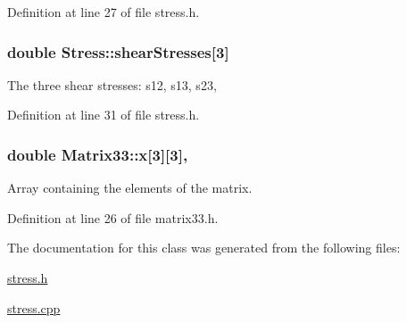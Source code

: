 Definition at line 27 of file stress.\-h.

\hypertarget{classStress_a77e8705e56c2fb56826a638edf3f78bf}{
\subsubsection[{shear\-Stresses}]{\setlength{\rightskip}{0pt plus 5cm}double Stress\-::shear\-Stresses\mbox{[}3\mbox{]}\hspace{0.3cm}{\ttfamily [protected]}}}\label{d1/d1c/classStress_a77e8705e56c2fb56826a638edf3f78bf}
The three shear stresses\-: s12, s13, s23, 

Definition at line 31 of file stress.\-h.

\hypertarget{classMatrix33_af7f01fa466616eb7c8eda2e4d9f85cdd}{
\subsubsection[{x}]{\setlength{\rightskip}{0pt plus 5cm}double Matrix33\-::x\mbox{[}3\mbox{]}\mbox{[}3\mbox{]}\hspace{0.3cm}{\ttfamily [protected]}, {\ttfamily [inherited]}}}\label{de/d82/classMatrix33_af7f01fa466616eb7c8eda2e4d9f85cdd}


Array containing the elements of the matrix. 



Definition at line 26 of file matrix33.\-h.



The documentation for this class was generated from the following files\-:\begin{DoxyCompactItemize}
\item 
\hyperlink{stress_8h}{stress.\-h}\item 
\hyperlink{stress_8cpp}{stress.\-cpp}\end{DoxyCompactItemize}
